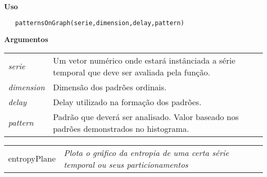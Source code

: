 \vspace{-0.5cm}

\hrulefill  

\vspace{0.5cm}

\textbf{Uso}

\begin{lstlisting}
   patternsOnGraph(serie,dimension,delay,pattern)
\end{lstlisting}

\vspace{0.5cm}

\textbf{Argumentos}

\begin{table}[!ht]
\begin{center}
\begin{tabularx}{\textwidth}{X X}
\hspace{0.5cm} \textit{serie} \vspace{0.5cm}& Um vetor numérico onde estará instânciada a série temporal que deve ser avaliada pela função.\vspace{0.5cm}\\
\hspace{0.5cm} \textit{dimension} \vspace{0.5cm}& Dimensão dos padrões ordinais.\vspace{0.5cm}\\
\hspace{0.5cm} \textit{delay} \vspace{0.5cm}& Delay utilizado na formação dos padrões.\vspace{0.5cm}\\
\hspace{0.5cm} \textit{pattern} \vspace{0.5cm}& Padrão que deverá ser analisado. Valor baseado nos padrões demonstrados no histograma.\vspace{0.5cm}\\
\end{tabularx}
\end{center}
\end{table} 
\newpage

\hrulefill   

\begin{table}[!ht]
\begin{center}
\begin{tabularx}{\textwidth}{ X X}
\hspace{0.5cm} entropyPlane & \textit{Plota o gráfico da entropia de uma certa série temporal ou seus particionamentos}\\
\end{tabularx}
\end{center}
\end{table} 

